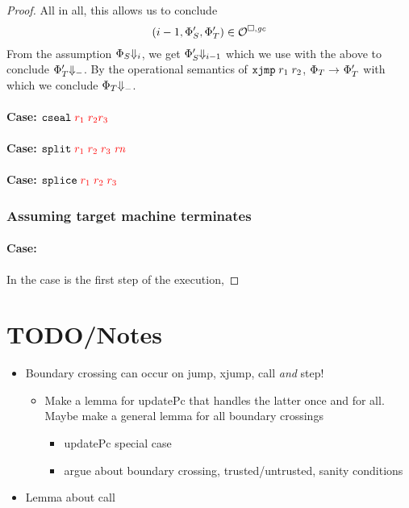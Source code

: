 \documentclass[a4paper]{article}
\begin{document}
\begin{proof}
All in all, this allows us to conclude
\[
  \npair[i-1]{\Phi_S',\Phi_T'} \in \lro
\]
From the assumption $\Phi_S\term[i]$, we get $\Phi'_S\term[i-1]$ which we use with the above to conclude $\Phi_T' \term$. By the operational semantics of $\txjmp{r_1}{r_2}$, $\Phi_T \step \Phi_T'$ with which we conclude $\Phi_T \term$.


\paragraph{Case: $\protect\tcseal{\trg{r_1}}{\trg{r_2}}{\trg{r_3}}$}

\paragraph{Case: $\protect\tsplit{\trg{r_1}}{\trg{r_2}}{\trg{r_3}}{\trg{\rn}}$}

\paragraph{Case: $\protect\tsplice{\trg{r_1}}{\trg{r_2}}{\trg{r_3}}$}

\subsubsection*{Assuming target machine terminates}
\paragraph{Case: }
In the case  is the first step of the execution,


\end{proof}

\begin{lemma}
  
\end{lemma}

\section{TODO/Notes}
\begin{itemize}
\item Boundary crossing can occur on jump, xjump, call \emph{and} step!
  \begin{itemize}
  \item Make a lemma for updatePc that handles the latter once and for all. Maybe make a general lemma for all boundary crossings
    \begin{itemize}
    \item updatePc special case
    \item argue about boundary crossing, trusted/untrusted, sanity conditions
    \end{itemize}
  \end{itemize}
\item Lemma about call
\end{itemize}
\end{document}
